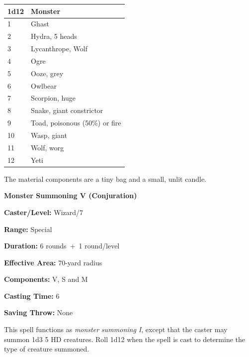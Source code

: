 \begin{multicols}{2}
\noindent
\begin{tabular}{|p{}|p{}|}
\hline
1d12	& Monster \\
\hline\hline
\rowcolor[gray]{.9}1	& Ghast \\
2	& Hydra, 5 heads \\
\rowcolor[gray]{.9}3	& Lycanthrope, Wolf \\
4	& Ogre \\
\rowcolor[gray]{.9}5	& Ooze, grey \\
6	& Owlbear \\
\rowcolor[gray]{.9}7	& Scorpion, huge \\
8	& Snake, giant constrictor \\
\rowcolor[gray]{.9}9	& Toad, poisonous (50\%) or fire \\
10	& Wasp, giant \\
\rowcolor[gray]{.9}11	& Wolf, worg \\
12	& Yeti \\
\hline
\end{tabular}

The material components are a tiny bag and a small, unlit candle.

\vspace{1em}

\noindent
\begin{minipage}{\columnwidth}

\noindent \textbf{Monster Summoning V (Conjuration)}

\noindent \textbf{Caster/Level:} Wizard/7

\noindent \textbf{Range:} Special

\noindent \textbf{Duration:} 6 rounds~+~1 round/level

\noindent \textbf{Effective Area:} 70-yard radius

\noindent \textbf{Components:} V, S and M

\noindent \textbf{Casting Time:} 6

\noindent \textbf{Saving Throw:} None

\end{minipage}

This spell functions as \textit{monster summoning I}, except that the caster may summon 1d3 5 HD creatures.  Roll 1d12 when the spell is cast to determine the type of creature summoned.


\end{multicols}
